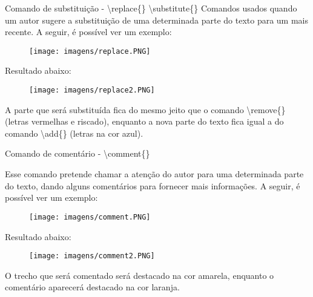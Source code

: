 \documentclass[aspectratio=169,smaller]{beamer}
\begin{document}
\begin{frame}{Comando de substituição - \textbackslash replace\{\}  \textbackslash substitute\{\}}
\justifying
Comandos usados quando um autor sugere a substituição de uma determinada parte do
texto para um mais recente. A seguir, é possível ver um exemplo:

\begin{figure}
        \centering
        \texttt{[image: imagens/replace.PNG]}
    \end{figure}

Resultado abaixo:

\begin{figure}
        \centering
        \texttt{[image: imagens/replace2.PNG]}
    \end{figure}

A parte que será substituída fica do mesmo jeito que o comando \textbackslash remove\{\} (letras vermelhas e riscado), enquanto a nova parte do texto fica igual a do comando \textbackslash add\{\} (letras na cor azul).

\end{frame}

\begin{frame}{Comando de comentário - \textbackslash comment\{\}}
\justifying

Esse comando pretende chamar a atenção do autor para uma determinada parte do texto, dando alguns comentários para fornecer mais informações. A seguir, é possível ver um exemplo:


\begin{figure}
        \centering
        \texttt{[image: imagens/comment.PNG]}
    \end{figure}

Resultado abaixo:

\begin{figure}
        \centering
        \texttt{[image: imagens/comment2.PNG]}
    \end{figure}

O trecho que será comentado será destacado na cor amarela, enquanto o comentário aparecerá destacado na cor laranja.

\end{frame}
\end{document}

